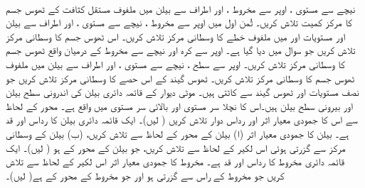 \\
نیچے سے مستوی ، اوپر سے مخروط ، اور اطراف سے بیلن  میں ملفوف  مستقل کثافت کے ٹھوس جسم کا  مرکز کمیت تلاش کریں۔
ثُمن اول میں اوپر سے مخروط ، نیچے سے مستوی ، اور اطراف سے بیلن  اور مستویات  اور  میں ملفوف  خطے کا وسطانی مرکز تلاش کریں۔
اس ٹھوس جسم کا وسطانی مرکز تلاش کریں جو سوال  میں دیا گیا ہے۔ 
اوپر سے کرہ  اور نیچے سے  مخروط  کے درمیان واقع ٹھوس جسم کا وسطانی مرکز تلاش کریں۔
اوپر سے سطح ، نیچے سے مستوی ، اور اطراف سے  بیلن  میں ملفوف ٹھوس جسم کا وسطانی مرکز تلاش کریں۔
 ٹھوس گیند    کے اس حصے کا وسطانی مرکز تلاش کریں جو نصف مستویات  اور  ٹھوس گیند   سے  کاٹتی ہیں۔
 موٹی دیوار کے قائمہ دائری بیلن   کی اندرونی سطح بیلن  اور بیرونی سطح بیلن  ہیں۔اس کا نچلا سر مستوی  اور بالائی سر  مستوی   میں واقع ہے۔ محور  کے لحاظ سے  اس  کا جمودی معیار اثر اور رداس دوار تلاش کریں ( لیں)۔
ایک قائمہ دائری بیلن کا رداس  اور قد  ہے۔   بیلن کا جمودی معیار اثر (ا) بیلن کے محور کے لحاظ سے تلاش کریں،  (ب) بیلن کے وسطانی مرکز سے گزرتی ہوئی  اس  لکیر کے لحاظ سے تلاش کریں،  جو بیلن کے محور کے   ہو ( لیں)۔
ایک قائمہ دائری  مخروط کا   رداس    اور قد  ہے۔ مخروط کا جمودی معیار اثر  اس لکیر کے لحاظ سے تلاش کریں  جو مخروط کے راس سے گزرتی ہو اور جو مخروط کے محور کے   ہے( لیں)۔
